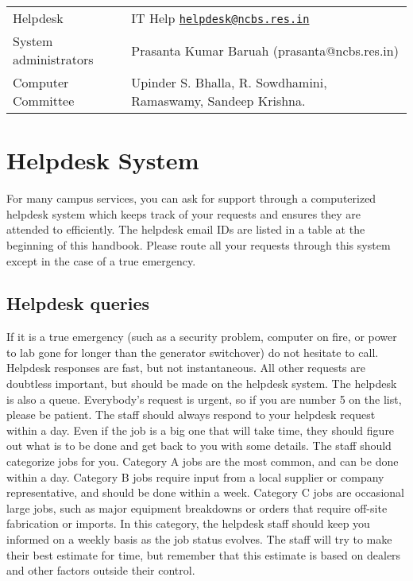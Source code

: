 \documentclass[a4paper,10pt]{article}
\newcommand\MAILTO[2]{#1 \Letter\; \href{mailto:#2}{\nolinkurl{#2}}}
\begin{document}
\begin{tabular}{l l}
    Helpdesk & \MAILTO{IT Help}{helpdesk@ncbs.res.in} \\
    System administrators & Prasanta Kumar Baruah (prasanta@ncbs.res.in) \\
    Computer Committee & Upinder S. Bhalla, R. Sowdhamini, Ramaswamy, Sandeep Krishna.
\end{tabular} 

\section{Helpdesk System}

For many campus services, you can ask for support through a computerized helpdesk system
which keeps track of your requests and ensures they are attended to efficiently. The
helpdesk email IDs are listed in a table at the beginning of this handbook. Please route all
your requests through this system except in the case of a true emergency.

\subsection{Helpdesk queries}
If it is a true emergency (such as a security problem, computer on fire, or
power to lab gone for longer than the generator switchover) do not hesitate to call. Helpdesk
responses are fast, but not instantaneous. All other requests are doubtless important, but
should be made on the helpdesk system.
The helpdesk is also a queue. Everybody's request is urgent, so if you are number 5 on the
list, please be patient.
The staff should always respond to your helpdesk request within a day. Even if the job is a
big one that will take time, they should figure out what is to be done and get back to you
with some details.
The staff should categorize jobs for you. Category A jobs are the most common, and can be
done within a day. Category B jobs require input from a local supplier or company
representative, and should be done within a week. Category C jobs are occasional large jobs,
such as major equipment breakdowns or orders that require off-site fabrication or imports. In
this category, the helpdesk staff should keep you informed on a weekly basis as the job
status evolves. The staff will try to make their best estimate for time, but remember that this
estimate is based on dealers and other factors outside their control.
\end{document}
